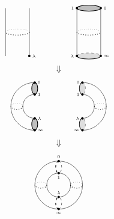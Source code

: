 {$$\begin{tikzpicture}[scale=0.5]
\fill (-2, -2) circle (0.1) node[right]{\tiny $ \lambda $};
\draw (-4, -2) to (-4, 2);
\draw (-2, -2) to (-2, 2);
\draw [dotted] (-2, 0) arc (0:180:1 and 0.25);
\draw [dotted, thick] (-2, 0) arc (0:-180:1 and 0.25);
\draw [fill=lightgray, thick] (3, 2) ellipse (1 and 0.25);
\fill (2, 2) circle (0.1) node[left]{\tiny $ 1 $};
\fill (4, 2) circle (0.1) node[right]{\tiny $ 0 $};
\draw [dashed] (2, -2) arc (180:0:1 and 0.25);
\draw [thick] (2, -2) arc (-180:0:1 and 0.25);
\fill [lightgray, opacity=0.5] (3, -2) ellipse (1 and 0.25);
\fill (2, -2) circle (0.1) node[left]{\tiny $ \lambda $};
\fill (4, -2) circle (0.1) node[right]{\tiny $ \infty $};
\draw (2, -2) to (2, 2);
\draw (4, -2) to (4, 2);
\draw [dotted] (2, 0) arc (180:0:1 and 0.25);
\draw [dotted, thick] (2, 0) arc (-180:0:1 and 0.25);
\end{tikzpicture}
$$
$$ \Downarrow $$
$$
\begin{tikzpicture}[scale=0.5]
\draw [fill=lightgray, thick] (-2, 1.5) ellipse (0.25 and 0.5);
\fill (-2, 2) circle (0.1) node[right]{\tiny $ 0 $};
\fill (-2, 1) circle (0.1) node[right]{\tiny $ 1 $};
\draw [fill=lightgray, thick] (-2, -1.5) ellipse (0.25 and 0.5);
\fill (-2, -1) circle (0.1) node[right]{\tiny $ \lambda $};
\fill (-2, -2) circle (0.1) node[right]{\tiny $ \infty $};
\draw (-2, 2) arc (90:270:2 and 2);
\draw (-2, 1) arc (90:270:1 and 1);
\draw [dotted] (-3, 0) arc (0:180:0.5 and 0.25);
\draw [dotted, thick] (-3, 0) arc (0:-180:0.5 and 0.25);
\draw [dashed] (2, 2) arc (90:-90:0.25 and 0.5);
\draw [thick] (2, 2) arc (90:270:0.25 and 0.5);
\fill [lightgray, opacity=0.5] (2, 1.5) ellipse (0.25 and 0.5);
\fill (2, 2) circle (0.1) node[left]{\tiny $ 0 $};
\fill (2, 1) circle (0.1) node[left]{\tiny $ 1 $};
\draw [dashed] (2, -2) arc (-90:90:0.25 and 0.5);
\draw [thick] (2, -2) arc (270:90:0.25 and 0.5);
\fill [lightgray, opacity=0.5] (2, -1.5) ellipse (0.25 and 0.5);
\fill (2, -1) circle (0.1) node[left]{\tiny $ \lambda $};
\fill (2, -2) circle (0.1) node[left]{\tiny $ \infty $};
\draw (2, 2) arc (90:-90:2 and 2);
\draw (2, 1) arc (90:-90:1 and 1);
\draw [dotted] (3, 0) arc (180:0:0.5 and 0.25);
\draw [dotted, thick] (3, 0) arc (-180:0:0.5 and 0.25);
\end{tikzpicture}
$$
$$ \Downarrow $$
$$
\begin{tikzpicture}[scale=0.5]
\draw (0, 0) circle (2);
\draw (0, 0) circle (1);
\draw [dashed] (0, 2) arc (90:-90:0.25 and 0.5);
\draw [dashed, thick] (0, 2) arc (90:270:0.25 and 0.5);
\fill (0, 2) circle (0.1) node[above]{\tiny $ 0 $};
\fill (0, 1) circle (0.1) node[below]{\tiny $ 1 $};
\draw [dashed] (0, -2) arc (-90:90:0.25 and 0.5);
\draw [dashed, thick] (0, -2) arc (270:90:0.25 and 0.5);
\fill (0, -1) circle (0.1) node[above]{\tiny $ \lambda $};
\fill (0, -2) circle (0.1) node[below]{\tiny $ \infty $};
\draw [dotted] (-1, 0) arc (0:180:0.5 and 0.25);
\draw [dotted, thick] (-1, 0) arc (0:-180:0.5 and 0.25);
\draw [dotted] (1, 0) arc (180:0:0.5 and 0.25);
\draw [dotted, thick] (1, 0) arc (-180:0:0.5 and 0.25);
\end{tikzpicture}
$$
}
